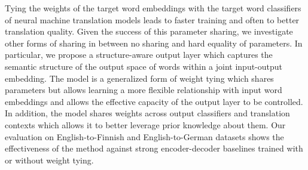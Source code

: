 Tying the weights of the target word embeddings with the target word classifiers of neural machine translation models leads to faster training and often to better translation quality. Given the success of this parameter sharing, we investigate other forms of sharing in between no sharing and hard equality of parameters.  In particular, we propose a structure-aware output layer which captures the semantic structure of the output space of words within a joint input-output embedding. The model is a  generalized form of weight tying which shares parameters but allows learning a more flexible relationship with input word embeddings and allows the effective capacity of the output layer to be controlled. In addition, the model shares weights across output classifiers and translation contexts which allows it to better leverage prior knowledge about them.  Our evaluation on English-to-Finnish and English-to-German datasets shows the effectiveness of the method against strong encoder-decoder baselines trained with or without weight tying.
